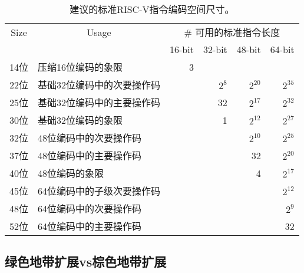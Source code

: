 \begin{table}[H]
\begin{center}
\begin{tabular}{|c|l|r|r|r|r|}
\hline
\multicolumn{1}{|c|}{Size} & \multicolumn{1}{|c|}{Usage} &
\multicolumn{4}{|c|}{\# 可用的标准指令长度} \\ \cline{3-6}
 & &
\multicolumn{1}{|c|}{16-bit} &
\multicolumn{1}{|c|}{32-bit} &
\multicolumn{1}{|c|}{48-bit} &
\multicolumn{1}{|c|}{64-bit} \\ \hline \hline
14位 & 压缩16位编码的象限 & 3       &         &         &         \\ \hline \hline
22位 & 基础32位编码中的次要操作码   &         & $2^{8}$ & $2^{20}$ & $2^{35}$ \\ \hline
25位 & 基础32位编码中的主要操作码  &         &      32 & $2^{17}$ & $2^{32}$ \\ \hline
30位 & 基础32位编码的象限       &         &       1 & $2^{12}$ & $2^{27}$ \\ \hline \hline
32位 & 48位编码中的次要操作码        &         &         & $2^{10}$ & $2^{25}$ \\ \hline
37位 & 48位编码中的主要操作码        &         &         &       32 & $2^{20}$ \\ \hline
40位 & 48位编码的象限            &         &         &        4 & $2^{17}$ \\ \hline \hline
45位 & 64位编码中的子级次要操作码    &         &         &          & $2^{12}$ \\ \hline
48位 & 64位编码中的次要操作码        &         &         &          & $2^{9}$  \\ \hline
52位 & 64位编码中的主要操作码        &         &         &          &      32\\ \hline
\end{tabular}
\end{center}
\caption{建议的标准RISC-V指令编码空间尺寸。}
\label{encodingspaces}
\end{table}

\vspace{-0.2in}
\subsection*{绿色地带扩展vs棕色地带扩展}

